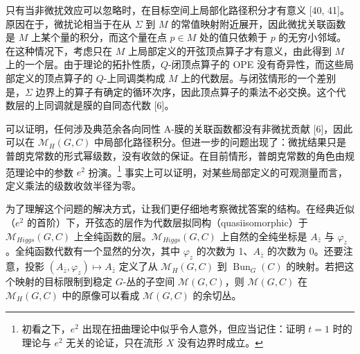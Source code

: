 \documentclass[11pt,a4paper,UTF8]{ctexart}
\begin{document}

只有当非微扰效应可以忽略时，在目标空间上局部化路径积分才有意义 [40, 41]。原因在于，微扰论相当于在从 $\Sigma$ 到 $M$ 的常值映射附近展开，因此微扰关联函数是 $M$ 上某个量的积分，而这个量在点 $p\in M$ 处的值只依赖于 $p$ 的无穷小邻域。在这种情况下，考虑只在 $M$ 上局部定义的开弦顶点算子才有意义，由此得到 $M$ 上的一个层。由于理论的拓扑性质，$Q$-闭顶点算子的 OPE 没有奇异性，而这些局部定义的顶点算子的 $Q$-上同调类构成 $M$ 上的代数层。与闭弦情形的一个差别是，$\Sigma$ 边界上的算子有确定的循环次序，因此顶点算子的乘法不必交换。这个代数层的上同调就是膜的自同态代数 [6]。


可以证明，任何涉及典范余各向同性 A-膜的关联函数都没有非微扰贡献 [6]，因此可以在 $\mathcal{M}_{H}(G,C)$ 中局部化路径积分。但进一步的问题出现了：微扰结果只是普朗克常数的形式幂级数，没有收敛的保证。在目前情形，普朗克常数的角色由规范理论中的参数 $e^{2}$ 扮演。\footnote{初看之下，$e^{2}$ 出现在扭曲理论中似乎令人意外，但应当记住：证明 $t=1$ 时的理论与 $e^{2}$ 无关的论证，只在流形 $X$ 没有边界时成立。} 事实上可以证明，对某些局部定义的可观测量而言，定义乘法的级数收敛半径为零。


为了理解这个问题的解决方式，让我们更仔细地考察微扰答案的结构。在经典近似（$e^{2}$ 的首阶）下，开弦态的层作为代数层拟同构（quasiisomorphic）于 $\mathcal{M}_{Higgs}(G,C)$ 上全纯函数的层。$\mathcal{M}_{Higgs}(G,C)$ 上自然的全纯坐标是 $A_{\bar z}$ 与 $\varphi_{z}$。全纯函数代数有一个显然的分次，其中 $\varphi_{z}$ 的次数为 1、$A_{\bar z}$ 的次数为 0。还要注意，投影 $(A_{\bar z},\varphi_{z})\mapsto A_{\bar z}$ 定义了从 $\mathcal{M}_{H}(G,C)$ 到 $\operatorname{Bun}_{G}(C)$ 的映射。若把这个映射的目标限制到稳定 $G$-丛的子空间 $\mathcal{M}(G,C)$，则 $\mathcal{M}(G,C)$ 在 $\mathcal{M}_{H}(G,C)$ 中的原像可以看成 $\mathcal{M}(G,C)$ 的余切丛。
\end{document}
